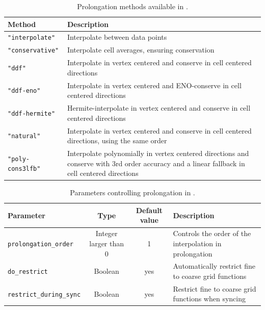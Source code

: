 \begin{table}[ht]
  \centering
  \begin{tabularx}{\textwidth}{lX}
    Method                   & Description                                                                                                                                   \\\hline\hline
    \texttt{"interpolate"}   & Interpolate between data points                                                                                                               \\
    \texttt{"conservative"}  & Interpolate cell averages, ensuring conservation                                                                                              \\
    \texttt{"ddf"}           & Interpolate in vertex centered and conserve in cell centered directions                                                                       \\
    \texttt{"ddf-eno"}       & Interpolate in vertex centered and ENO-conserve in cell centered directions                                                                   \\
    \texttt{"ddf-hermite"}   & Hermite-interpolate in vertex centered and conserve in cell centered directions                                                               \\
    \texttt{"natural"}       & Interpolate in vertex centered and conserve in cell centered directions, using the same order                                                 \\
    \texttt{"poly-cons3lfb"} & Interpolate polynomially in vertex centered directions and conserve with 3rd order accuracy and a linear fallback in cell centered directions \\\hline\hline
  \end{tabularx}
  \caption{Prolongation methods available in \CarpetX.}
  \label{tab:prolongation_methods}
\end{table}

\begin{table}[ht]
  \centering
  \begin{tabularx}{\textwidth}{lccX}
    Parameter                       & Type                  & Default value & Description                                             \\\hline\hline
    \texttt{prolongation\_order}    & Integer larger than 0 & 1             & Controls the order of the interpolation in prolongation \\
    \texttt{do\_restrict}           & Boolean               & yes           & Automatically restrict fine to coarse grid functions    \\
    \texttt{restrict\_during\_sync} & Boolean               & yes           & Restrict fine to coarse grid functions when syncing     \\
  \end{tabularx}
  \caption{Parameters controlling prolongation in \CarpetX.}
  \label{tab:other_prolongation_params}
\end{table}

